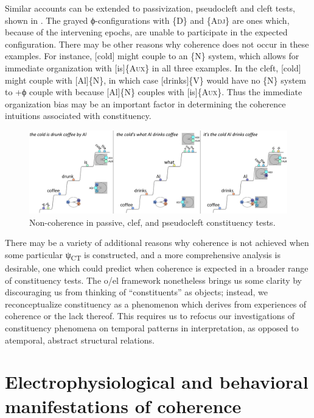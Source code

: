   Similar accounts can be extended to passivization, pseudocleft and cleft tests, shown in {}. The grayed ϕ-configurations with \{D\} and \{A\textsc{dj}\} are ones which, because of the intervening epochs, are unable to participate in the expected configuration. There may be other reasons why coherence does not occur in these examples. For instance, [cold] might couple to an \{N\} system, which allows for immediate organization with [is]\{A\textsc{ux}\} in all three examples. In the cleft, [cold] might couple with [Al]\{N\}, in which case [drinks]\{V\} would have no \{N\} system to +ϕ couple with because [Al]\{N\} couples with [is]\{A\textsc{ux}\}. Thus the immediate organization bias may be an important factor in determining the coherence intuitions associated with constituency.   

  
\begin{figure}
\includegraphics[width=\textwidth]{figures/Tilsen-img140.png}
\caption{Non-coherence in passive, clef, and pseudocleft constituency tests.}
\label{fig:6:21}
\end{figure}
 

  There may be a variety of additional reasons why coherence is not achieved when some particular ψ\textsubscript{CT} is constructed, and a more comprehensive analysis is desirable, one which could predict when coherence is expected in a broader range of constituency tests. The o/el framework nonetheless brings us some clarity by discouraging us from thinking of “constituents” as objects; instead, we reconceptualize constituency as a phenomenon which derives from experiences of coherence or the lack thereof. This requires us to refocus our investigations of constituency phenomena on temporal patterns in interpretation, as opposed to atemporal, abstract structural relations.

\section{Electrophysiological and behavioral manifestations of coherence}

